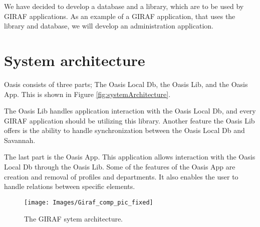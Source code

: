 We have decided to develop a database and a library, which are to be used by GIRAF applications.
As an example of a GIRAF application, that uses the library and database, we will develop an administration application.

\section{System architecture}
\label{sec:OasisSystemArchitecture}
Oasis consists of three parts; The Oasis Local Db, the Oasis Lib, and the Oasis App. This is shown in Figure \vref{fig:systemArchitecture}.

The Oasis Lib handles application interaction with the Oasis Local Db, and every GIRAF application should be utilizing this library.
Another feature the Oasis Lib offers is the ability to handle synchronization between the Oasis Local Db and Savannah.

The last part is the Oasis App.
This application allows interaction with the Oasis Local Db through the Oasis Lib. 
Some of the features of the Oasis App are creation and removal of profiles and departments.
It also enables the user to handle relations between specific elements.

\begin{figure}
	\centering
		\texttt{[image: Images/Giraf\_comp\_pic\_fixed]}
	\caption{The GIRAF sytem architecture.}
	\label{fig:systemArchitecture}
\end{figure}